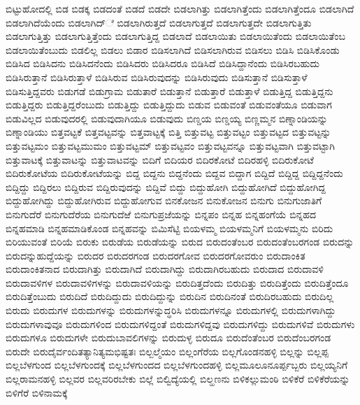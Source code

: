 {ಬಿಟ್ಟುಹೋದಲ್ಲಿ
ಬಿಡ
ಬಿಡಕ್ಕ
ಬಿಡದಂತೆ
ಬಿಡದೆ
ಬಿಡದೇ
ಬಿಡಲಾಗಿತ್ತು
ಬಿಡಲಾಗಿತ್ತೆಂದು
ಬಿಡಲಾಗಿತ್ತೆಂದೂ
ಬಿಡಲಾಗಿದೆ
ಬಿಡಲಾಗಿದೆಯೆಂದು
ಬಿಡಲಾಗಿದ್ೆ
ಬಿಡಲಾಗಿರುತ್ತದೆ
ಬಿಡಲಾಗುತ್ತದೆ
ಬಿಡಲಾಗುತ್ತದೇ
ಬಿಡಲಾಗುತ್ತಿತು
ಬಿಡಲಾಗುತ್ತಿತ್ತು
ಬಿಡಲಾಗುತ್ತಿತ್ತೆಂದು
ಬಿಡಲಾಗುತ್ತಿದ್ದ
ಬಿಡಲಾದೆ
ಬಿಡಲಾಯಿತು
ಬಿಡಲಾಯಿತೆಂದು
ಬಿಡಲಾಯಿತೆಂಬ
ಬಿಡಲಾಯಿತೆಂಬುದು
ಬಿಡಲಿಲ್ಲ
ಬಿಡಲು
ಬಿಡಾರ
ಬಿಡಿಸಲಾಗಿದೆ
ಬಿಡಿಸಲಾಗಿರುವ
ಬಿಡಿಸಲು
ಬಿಡಿಸಿ
ಬಿಡಿಸಿಕೊಂಡು
ಬಿಡಿಸಿದ
ಬಿಡಿಸಿದನು
ಬಿಡಿಸಿದನೆಂದು
ಬಿಡಿಸಿದರು
ಬಿಡಿಸಿದರೂ
ಬಿಡಿಸಿದೆ
ಬಿಡಿಸಿದ್ದಾನೆಂದು
ಬಿಡಿಸಿರಬಹುದು
ಬಿಡಿಸಿರುತ್ತಾನೆ
ಬಿಡಿಸಿರುತ್ತಾಳೆ
ಬಿಡಿಸಿರುವ
ಬಿಡಿಸಿರುವುದನ್ನು
ಬಿಡಿಸಿರುವುದು
ಬಿಡಿಸುತ್ತಾನೆ
ಬಿಡಿಸುತ್ತಾಳೆ
ಬಿಡಿಸುತ್ತಿದ್ದವರು
ಬಿಡುಗಡೆ
ಬಿಡುಗ್ರಾಮ
ಬಿಡುತಾರೆ
ಬಿಡುತ್ತಾನೆ
ಬಿಡುತ್ತಾರೆ
ಬಿಡುತ್ತಾಳೆ
ಬಿಡುತ್ತಿದ್ದ
ಬಿಡುತ್ತಿದ್ದನು
ಬಿಡುತ್ತಿದ್ದರು
ಬಿಡುತ್ತಿದ್ದರೆಂಬುದು
ಬಿಡುತ್ತಿದ್ದು
ಬಿಡುತ್ತಿದ್ದುದು
ಬಿಡುವ
ಬಿಡುವಂತೆ
ಬಿಡುವಂತೆಯೂ
ಬಿಡುವಾಗ
ಬಿಡುವಿಲ್ಲದ
ಬಿಡುವುದರಲ್ಲಿ
ಬಿಡುವುದಾಗಿಯೂ
ಬಿಡುವುದು
ಬಿಣ್ಡಯ
ಬಿಣ್ಡಯ್ಯ
ಬಿಣ್ಣಮ್ಮನ
ಬಿಣ್ನಾಂಡಿಯನ್ನು
ಬಿಣ್ನಾಂಡಿಯು
ಬಿತ್ತವಟ್ಟಕೆ
ಬಿತ್ತವಟ್ಟವನ್ನು
ಬಿತ್ತವಾಟ್ಟಕ್ಕೆ
ಬಿತ್ತಿ
ಬಿತ್ತುವಟ್ಟ
ಬಿತ್ತುವಟ್ಟಂ
ಬಿತ್ತುವಟ್ಟದ
ಬಿತ್ತುವಟ್ಟನ್ನು
ಬಿತ್ತುವಟ್ಟಮಂ
ಬಿತ್ತುವಟ್ಟಮುಮಂ
ಬಿತ್ತುವಟ್ಟಮ್
ಬಿತ್ತುವಟ್ಟವಂ
ಬಿತ್ತುವಟ್ಟವನ್ನೂ
ಬಿತ್ತುವಟ್ಟವಾಗಿ
ಬಿತ್ತುವಟ್ಟಾಗಿ
ಬಿತ್ತುವಾಟಕ್ಕೆ
ಬಿತ್ತುವಾಟನ್ನು
ಬಿತ್ತುವಾಟವನ್ನು
ಬಿದಿಗೆ
ಬಿದಿಯರ
ಬಿದಿರಕೋಟೆ
ಬಿದಿರಹಳ್ಳಿ
ಬಿದಿರುಕೋಟೆ
ಬಿದಿರುಕೋಟೆಯ
ಬಿದಿರುಕೋಟೆಯನ್ನು
ಬಿದ್ದ
ಬಿದ್ದನು
ಬಿದ್ದನೆಂದು
ಬಿದ್ದವ
ಬಿದ್ದಾಗ
ಬಿದ್ದಿದೆ
ಬಿದ್ದಿದ್ದ
ಬಿದ್ದಿದ್ದನೆಂದು
ಬಿದ್ದಿದ್ದು
ಬಿದ್ದಿರಲು
ಬಿದ್ದಿರುವ
ಬಿದ್ದಿರುವುದನ್ನು
ಬಿದ್ದಿವೆ
ಬಿದ್ದು
ಬಿದ್ದುಹೋಗಿ
ಬಿದ್ದುಹೋಗಿದೆ
ಬಿದ್ದುಹೋಗಿದ್ದ
ಬಿದ್ದುಹೋಗಿದ್ದು
ಬಿದ್ದುಹೋಗಿರುವ
ಬಿದ್ದುಹೋಗುವ
ಬಿನಕೋಜನ
ಬಿನುಕೋಜನ
ಬಿನುಗು
ಬಿನುಗುಜಾತಿಗೆ
ಬಿನುಗುದೆರೆ
ಬಿನುಗುದೆರೆಯ
ಬಿನುಗುದೆಱೆ
ಬಿನುಗುಪ್ರಜೆಯನ್ನು
ಬಿನ್ನಪಂ
ಬಿನ್ನಹ
ಬಿನ್ನಹಂಗೆಯೆ
ಬಿನ್ನಹದ
ಬಿನ್ನಹಮಾಡಿ
ಬಿನ್ನಹಮಾಡಿಕೊಂಡ
ಬಿನ್ನಹವನ್ನು
ಬಿಮಿಸೆಟ್ಟಿ
ಬಿಯಳಮ್ಮ
ಬಿಯಳಮ್ಮನಿಗೆ
ಬಿಯಳಮ್ಮನು
ಬಿರಿದು
ಬಿರಿಯುವಂತೆ
ಬಿರಿಯೆ
ಬಿರುಕು
ಬಿರುಡೆಯ
ಬಿರುಡೆಯನ್ನು
ಬಿರುದ
ಬಿರುದಂತೆಂಬರ
ಬಿರುದಂತೆಂಬರಗಂಡ
ಬಿರುದನ್ನು
ಬಿರುದನ್ನುಹುದ್ದೆಯನ್ನು
ಬಿರುದರ
ಬಿರುದರಗಂಡ
ಬಿರುದರಗೋವ
ಬಿರುದರಗೋವರುಂ
ಬಿರುದಾಂಕಿತ
ಬಿರುದಾಂಕಿತನಾದ
ಬಿರುದಾಗಿತ್ತು
ಬಿರುದಾಗಿದೆ
ಬಿರುದಾಗಿದ್ದು
ಬಿರುದಾಗಿರಬಹುದು
ಬಿರುದಾದ
ಬಿರುದಾವಳಿ
ಬಿರುದಾವಳಿಗಳ
ಬಿರುದಾವಳಿಗಳನ್ನು
ಬಿರುದಾವಳಿಯನ್ನು
ಬಿರುದಿತ್ತದೆಂದು
ಬಿರುದಿತ್ತು
ಬಿರುದಿತ್ತೆಂದು
ಬಿರುದಿತ್ತೆಂದೂ
ಬಿರುದಿತ್ತೆಂಬುದು
ಬಿರುದಿದೆ
ಬಿರುದಿದ್ದುದು
ಬಿರುದಿದ್ದುನ್ನು
ಬಿರುದಿನ
ಬಿರುದಿನಂತೆ
ಬಿರುದಿರಬಹುದು
ಬಿರುದಿಲ್ಲ
ಬಿರುದು
ಬಿರುದುಗಳ
ಬಿರುದುಗಳನ್ನು
ಬಿರುದುಗಳನ್ನುದ್ಧರಿಸಿ
ಬಿರುದುಗಳನ್ನೂ
ಬಿರುದುಗಳಲ್ಲಿ
ಬಿರುದುಗಳಾಗಿದ್ದು
ಬಿರುದುಗಳಾವುವೂ
ಬಿರುದುಗಳಿಂದ
ಬಿರುದುಗಳಿದ್ದಂತೆ
ಬಿರುದುಗಳಿದ್ದವು
ಬಿರುದುಗಳಿದ್ದು
ಬಿರುದುಗಳಿವೆ
ಬಿರುದುಗಳು
ಬಿರುದುಗಳೂ
ಬಿರುದುಗಳೇ
ಬಿರುದುಬಾವಲಿಗಳನ್ನು
ಬಿರುದುಳ್ಳ
ಬಿರುದೂ
ಬಿರುದೆಂತೆಂಬರ
ಬಿರುದೆಂಬರಗಂಡ
ಬಿರುದೇ
ಬಿರುದೈರ್ವಂದಿತತ್ಯಾನಿತ್ಯಮಭಿಷ್ಟತಃ
ಬಿಲ್ಬಲ್ಮೆಯಂ
ಬಿಲ್ಲಂಗೆರೆಯ
ಬಿಲ್ಲಗೊಂಡನಹಳ್ಳಿ
ಬಿಲ್ಲನ್ನು
ಬಿಲ್ಲಪ್ಪ
ಬಿಲ್ಲಬೆಳಗುಂದ
ಬಿಲ್ಲಬೆಳಗುಂದಕ್ಕೆ
ಬಿಲ್ಲಬೆಳಗುಂದದ
ಬಿಲ್ಲಬೆಳಗುಂದಹಳ್ಳಿ
ಬಿಲ್ಲಮೂಲೂನೂರ್ಪ್ಪಬ್ಬರು
ಬಿಲ್ಲಯ್ಯನಿಗೆ
ಬಿಲ್ಲರಾಮನಹಳ್ಳಿ
ಬಿಲ್ಲವರ
ಬಿಲ್ಲವರಿರಬೇಕು
ಬಿಲ್ಲೆ
ಬಿಲ್ವಿದ್ಯೆಯಲ್ಲಿ
ಬಿಲ್ಹಣನು
ಬಿಳಿಕಲ್ಲುಮಂಠಿ
ಬಿಳಿಕೆರೆ
ಬಿಳಿಕೆರೆಯನ್ನು
ಬಿಳಿಗೆರೆ
ಬಿಳಿನಾಮಕ್ಕೆ
}
